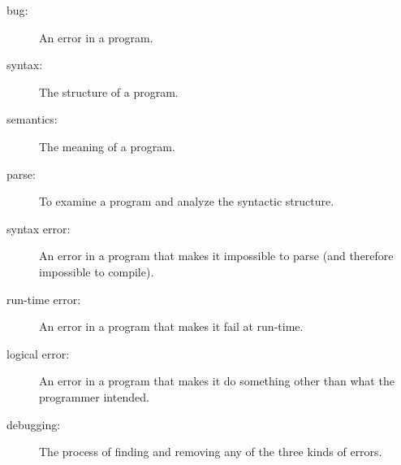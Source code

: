 \begin{description}
\item[bug:]  An error in a program.

\item[syntax:]  The structure of a program.

\item[semantics:]  The meaning of a program.

\item[parse:]  To examine a program and analyze the syntactic structure.

\item[syntax error:]  An error in a program that makes it impossible
to parse (and therefore impossible to compile).

\item[run-time error:]  An error in a program that makes it fail at
run-time.

\item[logical error:]  An error in a program that makes it do something
other than what the programmer intended.

\item[debugging:]  The process of finding and removing any of
the three kinds of errors.


\end{description}



